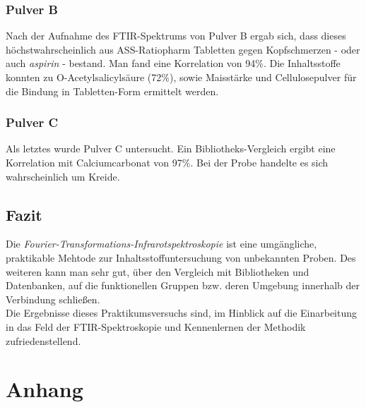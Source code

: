 \documentclass[a4paper,10pt,twocolumn]{article}
\newcommand{\tilt}[1]{\textit{#1}}
\begin{document}
		\subsubsection{Pulver B}

		Nach der  Aufnahme des FTIR-Spektrums von Pulver B ergab sich, dass dieses h\"ochstwahrscheinlich aus ASS-Ratiopharm Tabletten gegen Kopfschmerzen - oder auch \tilt{aspirin} - bestand. Man fand eine Korrelation von 94\%. Die Inhaltsstoffe konnten zu O-Acetylsalicyls\"aure (72\%), sowie Maisst\"arke und Cellulosepulver f\"ur die Bindung in Tabletten-Form ermittelt werden.

		\subsubsection{Pulver C}
	
		Als letztes wurde Pulver C untersucht. Ein Bibliotheks-Vergleich ergibt eine Korrelation mit Calciumcarbonat von 97\%. Bei der Probe handelte es sich wahrscheinlich um Kreide.
		
		\subsection{Fazit}

		Die \tilt{Fourier-Transformations-Infrarotspektroskopie} ist eine umg\"angliche, praktikable Mehtode zur Inhaltsstoffuntersuchung von unbekannten Proben. Des weiteren kann man sehr gut, \"uber den Vergleich mit Bibliotheken und Datenbanken, auf die funktionellen Gruppen bzw. deren Umgebung innerhalb der Verbindung schlie{\ss}en.\\
		Die Ergebnisse dieses Praktikumsversuchs sind, im Hinblick auf die Einarbeitung in das Feld der FTIR-Spektroskopie und Kennenlernen der Methodik zufriedenstellend. 

	
	

	\onecolumn
	\section{Anhang}
\end{document}

